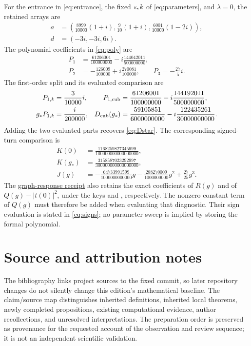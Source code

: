 \documentclass[11pt,a4paper]{article}
\numberwithin{equation}{section}
\theoremstyle{remark}\newtheorem{remark}[theorem]{Remark}
\begin{document}
For the entrance in \eqref{eq:entrance}, the fixed $\varepsilon,k$ of \eqref{eq:parameters}, and $\lambda=0$, the retained arrays are
\begin{align}
a&=\left(\frac{8999}{10000}(1+i),\frac9{10}(1+i),
                 \frac{6001}{10000}(1-2i)\right),\\
d&=(-3i,-3i,6i).
\end{align}
The polynomial coefficients in \eqref{eq:poly} are
\begin{align}
P_1&=\frac{61206001}{100000000}-i\frac{144042011}{500000000},\\
P_2&=-\frac{126009}{100000}+i\frac{270081}{100000},
\qquad P_3=-\frac{27}{5}i.
\end{align}
The first-order split and its evaluated comparison are
\begin{align}
P_{1,k}&=\frac3{10000}i,
&P_{1,\rm cub}&=\frac{61206001}{100000000}-i\frac{144192011}{500000000},\\
g_*P_{1,k}&=\frac{i}{200000},
&D_{\rm cub}(g_*)&=\frac{59105851}{6000000000}-i\frac{122435261}{30000000000}.
\end{align}
Adding the two evaluated parts recovers \eqref{eq:Dstar}. The corresponding signed-turn comparison is
\begin{align}
K(0)&=\frac{1168259827345999}{100000000000000000},\\
K(g_*)&=\frac{3158587023292997}{300000000000000000},\\
J(g)&=-\frac{64733991599}{1000000000000}g
      -\frac{288270009}{1000000000}g^2+\frac{27}{25}g^3.
\end{align}
The \href{evidence/delayed_graph_response_20261028.json}{graph-response receipt} also retains the exact coefficients of $R(g)$ and of $Q(g)-|t(0)|^2$, under the keys  and , respectively. The nonzero constant term of $Q(g)$ must therefore be added when evaluating that diagnostic. Their sign evaluation is stated in \eqref{eq:signs}; no parameter sweep is implied by storing the formal polynomial.

\section{Source and attribution notes}\label{app:sources}

The bibliography links project sources to the fixed commit, so later repository changes do not silently change this edition's mathematical baseline. The claim/source map distinguishes inherited definitions, inherited local theorems, newly completed propositions, existing computational evidence, author recollections, and unresolved interpretations. The preparation order is preserved as provenance for the requested account of the observation and review sequence; it is not an independent scientific validation.
\end{document}
